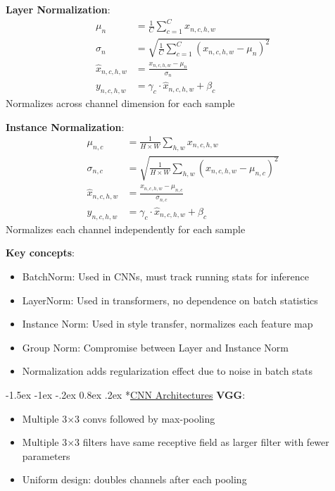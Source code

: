 \documentclass{article}
\makeatletter
\renewcommand\section{\@startsection{section}{1}{\z@}%
                                  {-1.5ex \@plus -1ex \@minus -.2ex}%
                                  {0.8ex \@plus.2ex}%
                                  {\normalfont\small\bfseries}}
\makeatother
\begin{document}
\begin{multicols}{3}
\textbf{Layer Normalization}:
\begin{align*}
\mu_n &= \frac{1}{C} \sum_{c=1}^{C} x_{n,c,h,w}\\
\sigma_n &= \sqrt{\frac{1}{C} \sum_{c=1}^{C} (x_{n,c,h,w} - \mu_n)^2}\\
\hat{x}_{n,c,h,w} &= \frac{x_{n,c,h,w} - \mu_n}{\sigma_n}\\
y_{n,c,h,w} &= \gamma_c \cdot \hat{x}_{n,c,h,w} + \beta_c
\end{align*}
Normalizes across channel dimension for each sample

\textbf{Instance Normalization}:
\begin{align*}
\mu_{n,c} &= \frac{1}{H \times W} \sum_{h,w} x_{n,c,h,w}\\
\sigma_{n,c} &= \sqrt{\frac{1}{H \times W} \sum_{h,w} (x_{n,c,h,w} - \mu_{n,c})^2}\\
\hat{x}_{n,c,h,w} &= \frac{x_{n,c,h,w} - \mu_{n,c}}{\sigma_{n,c}}\\
y_{n,c,h,w} &= \gamma_c \cdot \hat{x}_{n,c,h,w} + \beta_c
\end{align*}
Normalizes each channel independently for each sample

\textbf{Key concepts}:
\begin{itemize}
\item BatchNorm: Used in CNNs, must track running stats for inference
\item LayerNorm: Used in transformers, no dependence on batch statistics
\item Instance Norm: Used in style transfer, normalizes each feature map
\item Group Norm: Compromise between Layer and Instance Norm
\item Normalization adds regularization effect due to noise in batch stats
\end{itemize}

\section*{\underline{CNN Architectures}}
\textbf{VGG}:
\begin{itemize}
\item Multiple 3×3 convs followed by max-pooling
\item Multiple 3×3 filters have same receptive field as larger filter with fewer parameters
\item Uniform design: doubles channels after each pooling
\end{itemize}


\end{multicols}
\end{document}
